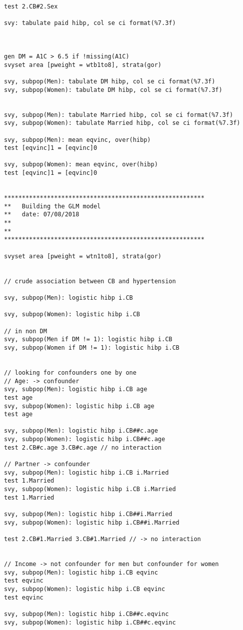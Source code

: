 \documentclass[]{article}
\begin{document}
\begin{verbatim}
test 2.CB#2.Sex

svy: tabulate paid hibp, col se ci format(%7.3f)



gen DM = A1C > 6.5 if !missing(A1C)
svyset area [pweight = wtb1to8], strata(gor)

svy, subpop(Men): tabulate DM hibp, col se ci format(%7.3f)
svy, subpop(Women): tabulate DM hibp, col se ci format(%7.3f)


svy, subpop(Men): tabulate Married hibp, col se ci format(%7.3f)
svy, subpop(Women): tabulate Married hibp, col se ci format(%7.3f)

svy, subpop(Men): mean eqvinc, over(hibp)
test [eqvinc]1 = [eqvinc]0

svy, subpop(Women): mean eqvinc, over(hibp)
test [eqvinc]1 = [eqvinc]0


********************************************************
**   Building the GLM model 
**   date: 07/08/2018
**
**
********************************************************

svyset area [pweight = wtn1to8], strata(gor)


// crude association between CB and hypertension 

svy, subpop(Men): logistic hibp i.CB

svy, subpop(Women): logistic hibp i.CB

// in non DM 
svy, subpop(Men if DM != 1): logistic hibp i.CB
svy, subpop(Women if DM != 1): logistic hibp i.CB


// looking for confounders one by one
// Age: -> confounder
svy, subpop(Men): logistic hibp i.CB age
test age
svy, subpop(Women): logistic hibp i.CB age
test age

svy, subpop(Men): logistic hibp i.CB##c.age
svy, subpop(Women): logistic hibp i.CB##c.age
test 2.CB#c.age 3.CB#c.age // no interaction

// Partner -> confounder
svy, subpop(Men): logistic hibp i.CB i.Married
test 1.Married
svy, subpop(Women): logistic hibp i.CB i.Married
test 1.Married

svy, subpop(Men): logistic hibp i.CB##i.Married
svy, subpop(Women): logistic hibp i.CB##i.Married

test 2.CB#1.Married 3.CB#1.Married // -> no interaction


// Income -> not confounder for men but confounder for women
svy, subpop(Men): logistic hibp i.CB eqvinc 
test eqvinc
svy, subpop(Women): logistic hibp i.CB eqvinc 
test eqvinc

svy, subpop(Men): logistic hibp i.CB##c.eqvinc 
svy, subpop(Women): logistic hibp i.CB##c.eqvinc 


\end{verbatim}
\end{document}
